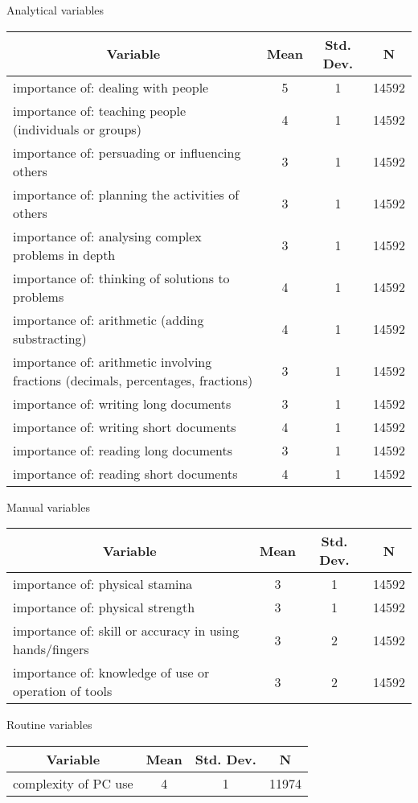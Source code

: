 
\begin{threeparttable}[htbp]\centering \caption{Analytical variables \label{sumstat}}
\begin{tabular}{l c c  c}\hline\hline
\multicolumn{1}{c}{\textbf{Variable}} & \textbf{Mean}
 & \textbf{Std. Dev.} & \textbf{N}\\ \hline
importance of: dealing with people & 5 & 1  & 14592\\
importance of: teaching people (individuals or groups) & 4 & 1  & 14592\\
importance of: persuading or influencing others & 3 & 1  & 14592\\
importance of: planning the activities of others & 3 & 1  & 14592\\
importance of: analysing complex problems in depth & 3 & 1  & 14592\\
importance of: thinking of solutions to problems & 4 & 1  & 14592\\
importance of: arithmetic (adding substracting) & 4 & 1  & 14592\\
importance of: arithmetic involving fractions (decimals, percentages, fractions) & 3 & 1  & 14592\\
importance of: writing long documents & 3 & 1  & 14592\\
importance of: writing short documents & 4 & 1  & 14592\\
importance of: reading long documents & 3 & 1  & 14592\\
importance of: reading short documents & 4 & 1  & 14592\\
\hline\end{tabular}\end{threeparttable}

\begin{threeparttable}[htbp]\centering \caption{Manual variables \label{sumstat}}
\begin{tabular}{l c c  c}\hline\hline
\multicolumn{1}{c}{\textbf{Variable}} & \textbf{Mean}
 & \textbf{Std. Dev.} & \textbf{N}\\ \hline
importance of: physical stamina & 3 & 1  & 14592\\
importance of: physical strength & 3 & 1  & 14592\\
importance of: skill or accuracy in using hands/fingers & 3 & 2  & 14592\\
importance of: knowledge of use or operation of tools & 3 & 2  & 14592\\
\hline\end{tabular}\end{threeparttable}

\begin{threeparttable}[htbp]\centering \caption{Routine variables \label{sumstat}}
\begin{tabular}{l c c  c}\hline\hline
\multicolumn{1}{c}{\textbf{Variable}} & \textbf{Mean}
 & \textbf{Std. Dev.} & \textbf{N}\\ \hline
complexity of PC use & 4 & 1  & 11974\\
\hline\end{tabular}\end{threeparttable}
